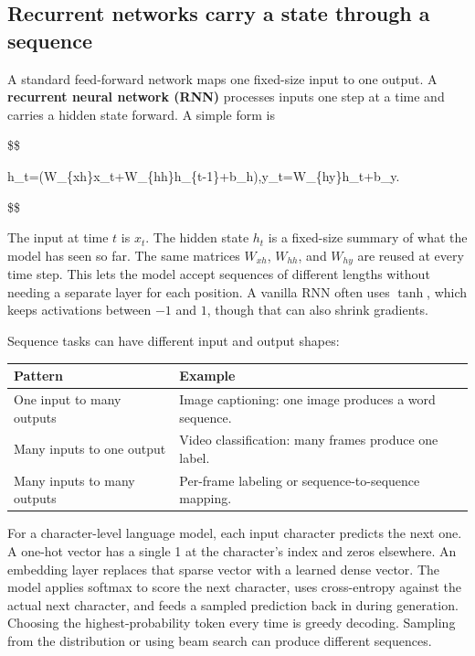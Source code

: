 \subsection{Recurrent networks carry a state through a sequence}\label{04-visual-computing-ii-ch031-recurrent-networks-carry-a-state-through-a-sequence}

A standard feed-forward network maps one fixed-size input to one output. A \textbf{recurrent neural network (RNN)} processes inputs one step at a time and carries a hidden state forward. A simple form is

\$\$

h\_t=\phi(W\_\{xh\}x\_t+W\_\{hh\}h\_\{t-1\}+b\_h),\qquad y\_t=W\_\{hy\}h\_t+b\_y.

\$\$

The input at time \(t\) is \(x_t\). The hidden state \(h_t\) is a fixed-size summary of what the model has seen so far. The same matrices \(W_{xh}\), \(W_{hh}\), and \(W_{hy}\) are reused at every time step. This lets the model accept sequences of different lengths without needing a separate layer for each position. A vanilla RNN often uses \(\tanh\), which keeps activations between \(-1\) and \(1\), though that can also shrink gradients.

Sequence tasks can have different input and output shapes:

{\def\LTcaptype{none} %
\begin{longtable}[]{@{}
  >{\raggedright\arraybackslash}p{}
  >{\raggedright\arraybackslash}p{}@{}}
\toprule\noalign{}
\begin{minipage}[b]{\linewidth}\raggedright
Pattern
\end{minipage} & \begin{minipage}[b]{\linewidth}\raggedright
Example
\end{minipage} \\
\midrule\noalign{}
\endhead
\bottomrule\noalign{}
\endlastfoot
One input to many outputs & Image captioning: one image produces a word sequence. \\
Many inputs to one output & Video classification: many frames produce one label. \\
Many inputs to many outputs & Per-frame labeling or sequence-to-sequence mapping. \\
\end{longtable}
}

For a character-level language model, each input character predicts the next one. A one-hot vector has a single 1 at the character's index and zeros elsewhere. An embedding layer replaces that sparse vector with a learned dense vector. The model applies softmax to score the next character, uses cross-entropy against the actual next character, and feeds a sampled prediction back in during generation. Choosing the highest-probability token every time is greedy decoding. Sampling from the distribution or using beam search can produce different sequences.

